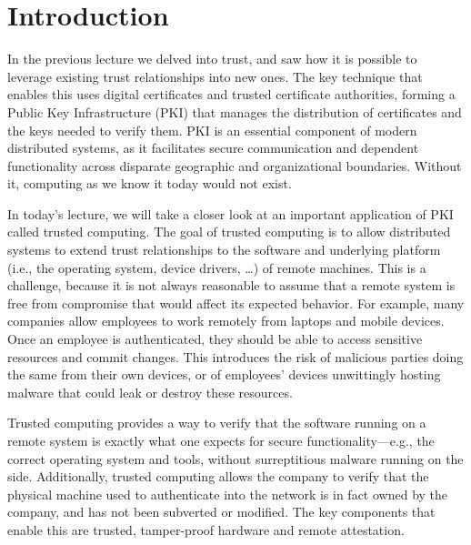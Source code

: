 \documentclass[11pt]{article}
\begin{document}
\maketitle


\section{Introduction}

In the previous lecture we delved into trust, and saw how it is possible to leverage existing trust relationships into new ones. The key technique that enables this uses digital certificates and trusted certificate authorities, forming a Public Key Infrastructure (PKI) that manages the distribution of certificates and the keys needed to verify them. PKI is an essential component of modern distributed systems, as it facilitates secure communication and dependent functionality across disparate geographic and organizational boundaries. Without it, computing as we know it today would not exist.

In today's lecture, we will take a closer look at an important application of PKI called trusted computing. The goal of trusted computing is to allow distributed systems to extend trust relationships to the software and underlying platform (i.e., the operating system, device drivers, \ldots) of remote machines. This is a challenge, because it is not always reasonable to assume that a remote system is free from compromise that would affect its expected behavior. For example, many companies allow employees to work remotely from laptops and mobile devices. Once an employee is authenticated, they should be able to access sensitive resources and commit changes. This introduces the risk of malicious parties doing the same from their own devices, or of employees' devices unwittingly hosting malware that could leak or destroy these resources.

Trusted computing provides a way to verify that the software running on a remote system is exactly what one expects for secure functionality---e.g., the correct operating system and tools, without surreptitious malware running on the side. Additionally, trusted computing allows the company to verify that the physical machine used to authenticate into the network is in fact owned by the company, and has not been subverted or modified. The key components that enable this are trusted, tamper-proof hardware and remote attestation.
\end{document}
